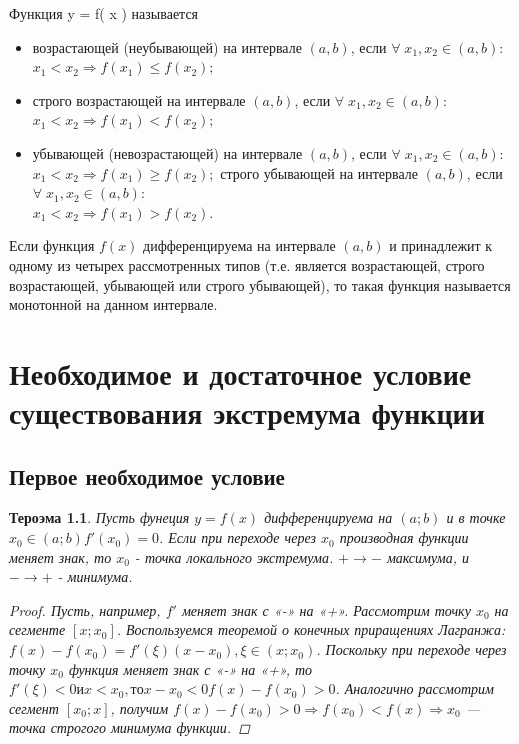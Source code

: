 \documentclass[oneside]{book}
\newtheorem{thm}{Тероэма}[chapter] %
\begin{document}
\begin{itemize}
\begin{enumerate}
Функция y = f\left( x \right) называется \\ 
\begin{itemize}
    \item возрастающей (неубывающей) на интервале $\left( {a,b} \right)$, если
    ${\forall\;{x_1},{x_2} \in \left( {a,b} \right):\;}$\\
    ${{x_1} < {x_2} \Rightarrow f\left( {{x_1}} \right) \leq f\left( {{x_2}} \right);}$
    \item строго возрастающей на интервале $\left( {a,b} \right)$, если
    ${\forall\;{x_1},{x_2} \in \left( {a,b} \right):\;}$\\
    ${{x_1} < {x_2} \Rightarrow f\left( {{x_1}} \right) \lt f\left( {{x_2}} \right);}$
    \item убывающей (невозрастающей) на интервале $\left( {a,b} \right)$, если
    ${\forall\;{x_1},{x_2} \in \left( {a,b} \right):\;}$\\
    ${{x_1} < {x_2} \Rightarrow f\left( {{x_1}} \right) \ge f\left( {{x_2}} \right);}$
    строго убывающей на интервале $\left( {a,b} \right)$, если
    ${\forall\;{x_1},{x_2} \in \left( {a,b} \right):\;}$\\
    ${{x_1} < {x_2} \Rightarrow f\left( {{x_1}} \right) \gt f\left( {{x_2}} \right).}$
\end{itemize}
Если функция $f\left( x \right)$ дифференцируема на интервале $\left( {a,b} \right)$ и принадлежит к одному из четырех рассмотренных типов
(т.е. является возрастающей, строго возрастающей, убывающей или строго убывающей), то такая функция называется монотонной на данном интервале. 
\setcounter{chapter}{27}         
\chapter{Необходимое и достаточное условие существования экстремума функции\\}
\section{Первое необходимое условие}
\begin{thm}
Пусть фунеция $y=f(x)$ дифференцируема на $(a;b)$ и в точке $x_0 \in (a;b) f'(x_0) = 0$. Если при переходе через $x_0$
производная функции меняет знак, то $x_0$  - точка локального экстремума. $+ \rightarrow -$ максимума, и $- \rightarrow +$ - минимума. 
\begin{proof}
Пусть, например, ${f}'$ меняет знак с «-» на «+». Рассмотрим точку $x_{0}$ на сегменте $\left [ x;x_{0} \right ]$. Воспользуемся теоремой о конечных приращениях Лагранжа: $f(x)-f(x_{0}) ={f}'(\xi)(x-x_{0}), \xi \in (x;x_{0})$. Поскольку при переходе через точку $x_{0}$ функция меняет знак с «-» на «+», то ${f}'(\xi)<0 и x< x_{0}, то x- x_{0}<0 f(x)-f(x_{0})>0$.
Аналогично рассмотрим сегмент $\left [ x_{0};x \right ]$, получим
$f(x)-f(x_{0})>0 \Rightarrow f(x_{0})< f(x) \Rightarrow   x_{0}$ — точка строгого минимума функции.
\end{proof}
\end{thm}

\end{enumerate}
\end{itemize}
\end{document}

